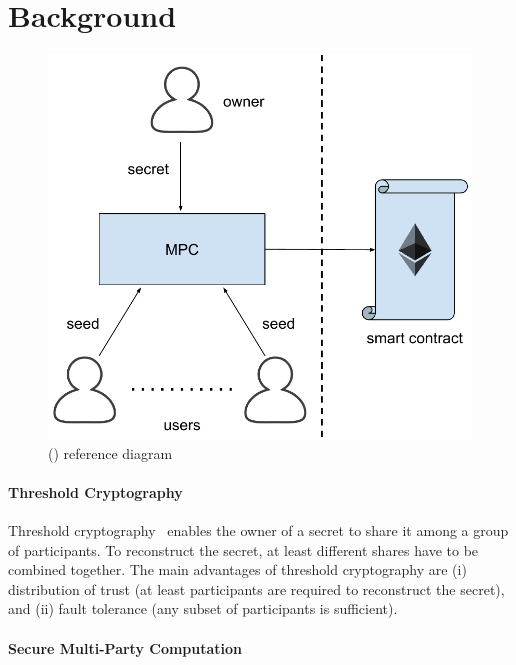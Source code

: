\vspace*{-2pt}
\section{Background}\label{sect:background}

\begin{figure}[tp]
	\centering
	\includegraphics[width=.75\columnwidth]{fig/proposal}
	\vspace*{11pt}
	\caption{\name (\shortname) reference diagram}
	\label{fig:model}
\end{figure}




\paragraph*{Threshold Cryptography}

Threshold cryptography~\cite{Shamir:1979:SS:359168.359176} enables the owner of a secret to share it among a group of participants. 
To reconstruct the secret, at least \K different shares have to be combined together.
The main advantages of threshold cryptography are (i) distribution of trust (at least \K participants are required to reconstruct the secret), and (ii) fault tolerance (any subset of \N participants is sufficient).

\smallskip

\paragraph*{Secure Multi-Party Computation}

